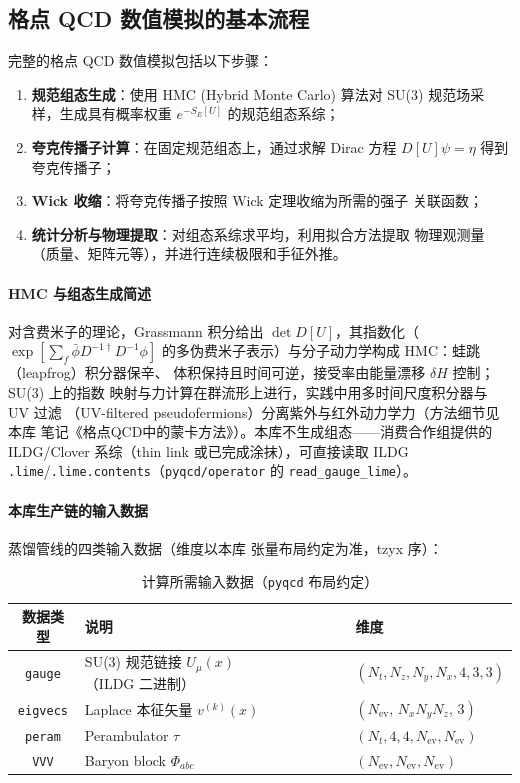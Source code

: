\documentclass[11pt,a4paper]{ctexart}
\newcommand{\code}[1]{\texttt{#1}}
\begin{document}
\subsection{格点 QCD 数值模拟的基本流程}

完整的格点 QCD 数值模拟包括以下步骤：
\begin{enumerate}
  \item \textbf{规范组态生成}：使用 HMC (Hybrid Monte Carlo) 算法对 SU(3)
  规范场采样，生成具有概率权重 $e^{-S_E[U]}$ 的规范组态系综；
  \item \textbf{夸克传播子计算}：在固定规范组态上，通过求解 Dirac 方程
  $D[U] \psi = \eta$ 得到夸克传播子；
  \item \textbf{Wick 收缩}：将夸克传播子按照 Wick 定理收缩为所需的强子
  关联函数；
  \item \textbf{统计分析与物理提取}：对组态系综求平均，利用拟合方法提取
  物理观测量（质量、矩阵元等），并进行连续极限和手征外推。
\end{enumerate}

\paragraph{HMC 与组态生成简述}对含费米子的理论，Grassmann 积分给出
$\det D[U]$，其指数化（$\exp[\sum_f\bar\phi D^{-1\dagger}D^{-1}\phi]$
的多伪费米子表示）与分子动力学构成 HMC：蛙跳（leapfrog）积分器保辛、
体积保持且时间可逆，接受率由能量漂移 $\delta H$ 控制；SU(3) 上的指数
映射与力计算在群流形上进行，实践中用多时间尺度积分器与 UV 过滤
（UV-filtered pseudofermions）分离紫外与红外动力学力（方法细节见本库
笔记《格点QCD中的蒙卡方法》）。本库不生成组态——消费合作组提供的
ILDG/Clover 系综（thin link 或已完成涂抹），可直接读取 ILDG
\code{.lime}/\code{.lime.contents}（\code{pyqcd/operator} 的
\code{read\_gauge\_lime}）。

\paragraph{本库生产链的输入数据}蒸馏管线的四类输入数据（维度以本库
张量布局约定为准，tzyx 序）：

\begin{table}[htbp]
\centering
\caption{计算所需输入数据（\code{pyqcd} 布局约定）}
\small
\begin{tabular}{c l l}
\toprule
\textbf{数据类型} & \textbf{说明} & \textbf{维度} \\
\midrule
\code{gauge} & SU(3) 规范链接 $U_\mu(x)$（ILDG 二进制） &
$(N_t,N_z,N_y,N_x,4,3,3)$ \\
\code{eigvecs} & Laplace 本征矢量 $v^{(k)}(x)$ &
$(N_{\text{ev}},\,N_xN_yN_z,\,3)$ \\
\code{peram} & Perambulator $\tau$ & $(N_t,4,4,N_{\text{ev}},N_{\text{ev}})$ \\
\code{VVV} & Baryon block $\Phi_{abc}$ & $(N_{\text{ev}},N_{\text{ev}},N_{\text{ev}})$ \\
\bottomrule
\end{tabular}
\end{table}
\end{document}
